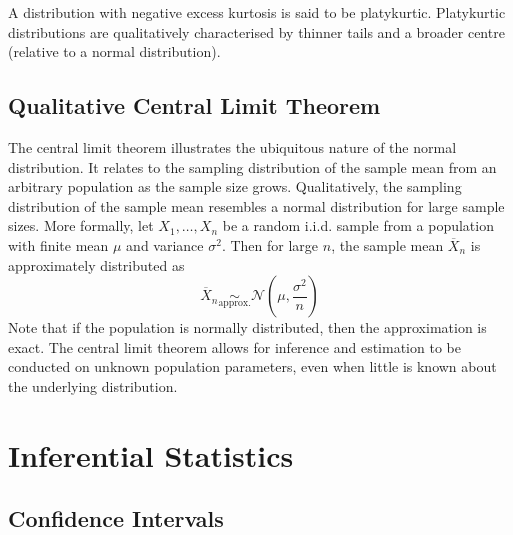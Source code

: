 \documentclass[11pt]{report} %
\begin{document}
A distribution with negative excess kurtosis is said to be platykurtic. Platykurtic distributions are qualitatively characterised by thinner tails and a broader centre (relative to a normal distribution).

\subsection{Qualitative Central Limit Theorem}

The central limit theorem illustrates the ubiquitous nature of the normal distribution. It relates to the sampling distribution of the sample mean from an arbitrary population as the sample size grows. Qualitatively, the sampling distribution of the sample mean resembles a normal distribution for large sample sizes. More formally, let $X_{1}, \dots, X_{n}$ be a random i.i.d. sample from a population with finite mean $\mu$ and variance $\sigma^{2}$. Then for large $n$, the sample mean $\overline{X}_{n}$ is approximately distributed as
\begin{equation}
\overline{X}_{n} \underset{\mathrm{approx.}}{\sim} \mathcal{N}\left(\mu, \dfrac{\sigma^{2}}{n}\right)
\end{equation}
Note that if the population is normally distributed, then the approximation is exact. The central limit theorem allows for inference and estimation to be conducted on unknown population parameters, even when little is known about the underlying distribution.

\section{Inferential Statistics}

\subsection{Confidence Intervals}
\end{document}
